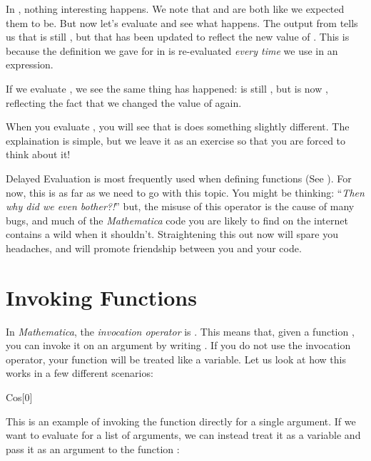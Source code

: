 In , nothing interesting happens. We note that  and  are both  like we expected them to be. But now let's evaluate  and see what happens. The output from  tells us that  is still , but that  has been updated to reflect the new value of . This is because the definition we gave for  in  is re-evaluated \emph{every time} we use  in an expression.

If we evaluate , we see the same thing has happened:  is still , but  is now , reflecting the fact that we changed the value of  again.

When you evaluate , you will see that is does something slightly different. The explaination is simple, but we leave it as an exercise so that you are forced to think about it!

Delayed Evaluation is most frequently used when defining functions (See ). For now, this is as far as we need to go with this topic. You might be thinking: ``\emph{Then why did we even bother?!}'' but, the misuse of this operator is the cause of many bugs, and much of the \emph{Mathematica} code you are likely to find on the internet contains a wild \expr{:=} when it shouldn't. Straightening this out now will spare you headaches, and will promote friendship between you and your code.

\section{Invoking Functions}
\label{sec:InvokingFunctions}

In \emph{Mathematica}, the \emph{invocation operator} is \expr{[]}. This means that, given a function , you can invoke it on an argument  by writing . If you do not use the invocation operator, your function will be treated like a variable. Let us look at how this works in a few different scenarios:

\begin{code}
	   Cos[0]\\
\end{code}

This is an example of invoking the  function directly for a single argument. If we want to evaluate  for a list of arguments, we can instead treat it as a variable and pass it as an argument to the function :


